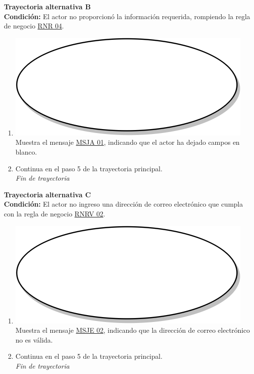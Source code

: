 \textbf{Trayectoria alternativa B} \label{cu2_ta_b} \\
\textbf{Condición:} El actor no proporcionó la información requerida, rompiendo la regla de negocio \hyperref[rnr_04]{RNR 04}.\\
 \begin{enumerate}[label=B\arabic*]
    \item {\includegraphics[scale=.05]{Capitulo3/img/proceso.png} Muestra el mensaje \hyperref[msja_01]{MSJA 01}, indicando que el actor ha dejado campos en blanco.}
    \item {Continua en el paso 5  de la trayectoria principal.} \\
    \textit{Fin de trayectoria} \\
\end{enumerate}

\textbf{Trayectoria alternativa C} \label{cu2_ta_c}\\
\textbf{Condición:} El actor no ingreso una dirección de correo electrónico que cumpla con la regla de negocio \hyperref[rnrv_02]{RNRV 02}.\\
 \begin{enumerate}[label=C\arabic*]
    \item {\includegraphics[scale=.05]{Capitulo3/img/proceso.png} Muestra el mensaje \hyperref[msje_02]{MSJE 02}, indicando que la dirección de correo electrónico no es válida.}
    \item {Continua en el paso 5 de la trayectoria principal.} \\
    \textit{Fin de trayectoria} \\
\end{enumerate}

